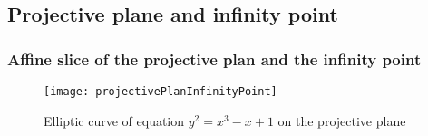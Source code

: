 \subsection{Projective plane and infinity point}
\begin{frame}[t]
    \frametitle{Affine slice of the projective plan and the infinity point}
        \begin{figure}[h]
            \centering
            \texttt{[image: projectivePlanInfinityPoint]}
            \caption{Elliptic curve of equation $y^2 = x^3 -x +1$ on the projective plane}
            \label{fig:courbePlanProjectif}
        \end{figure}
\end{frame}
